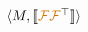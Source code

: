 \documentclass[crop,equation,convert={outext=.svg,command=\unexpanded{pdf2svg \infile\space\outfile}},multi=false]{standalone}
\begin{document}
\color{black}
    $\langle M, \llbracket{\color{darkorange}\mathcal{F}}{\color{darkorange}\mathcal{F}}^\top\rrbracket\rangle$
\end{document}
